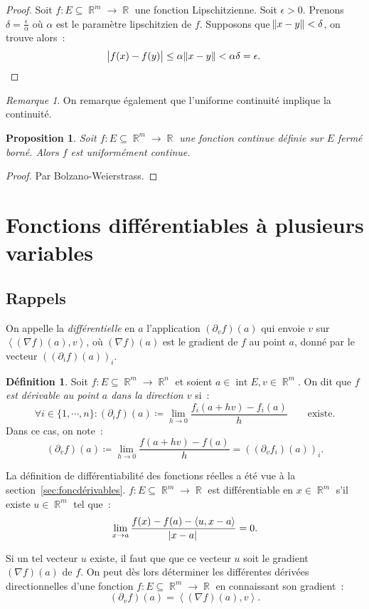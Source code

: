 \documentclass{article}
\DeclareMathOperator{\intr}{int}
\DeclareMathOperator{\R}{\mathbb R}
\newcommand{\scpr}[2]{{\left\langle#1, #2\right\rangle}}
\newcommand{\frmr}[2]{#1 : #2 \subseteq \R^m \to \R}
\newcommand{\frmrn}[2]{#1 : #2 \subseteq \R^m \to \R^n}
\newtheorem{prp}[thm]{Proposition}
\theoremstyle{definition}
\newtheorem{déf}[thm]{Définition}
\theoremstyle{remark}
\newtheorem*{rmq}{Remarque}
\begin{document}
		\begin{proof} Soit $\frmr fE$ une fonction Lipschitzienne. Soit $\epsilon > 0$. Prenons $\delta = \frac \epsilon\alpha$ où $\alpha$ est le paramètre
		lipschitzien de $f$. Supposons que $\norm{x-y} < \delta$, on trouve alors~:
		\[\abs {f(x)-f(y)} \leq \alpha\norm{x-y} < \alpha\delta = \epsilon.\]
		\end{proof}

		\begin{rmq} On remarque également que l'uniforme continuité implique la continuité. \end{rmq}

		\begin{prp} Soit $\frmr fE$ une fonction continue définie sur $E$ fermé borné. Alors $f$ est uniformément continue. \end{prp}

		\begin{proof} Par Bolzano-Weierstrass. \end{proof}

\newpage
\section{Fonctions différentiables à plusieurs variables}
	\subsection{Rappels}
		On appelle la \emph{différentielle} en $a$ l'application $(\partial_vf)(a)$ qui envoie $v$ sur $\scpr {(\nabla f)(a)}v$, où
		$(\nabla f)(a)$ est le gradient de $f$ au point $a$, donné par le vecteur $\left((\partial_if)(a)\right)_i$.

		\begin{déf} Soit $\frmrn fE$ et soient $a \in \intr E, v \in \R^m$. On dit que \emph{$f$ est dérivable au point $a$ dans la direction $v$} si~:
		\[\forall i \in \{1, \dotsb, n\} : (\partial_if)(a) \coloneqq \lim_{h \to 0}\frac {f_i(a+hv)-f_i(a)}h\qquad\text{existe}.\]
		Dans ce cas, on note~:
		\[(\partial_vf)(a) \coloneqq \lim_{h \to 0}\frac {f(a+hv)-f(a)}h = \left((\partial_vf_i)(a)\right)_i.\]
		\end{déf}

		La définition de différentiabilité des fonctions réelles a été vue à la section~\ref{sec:foncdérivables}. $\frmr fE$ est différentiable en $x \in \R^m$
		s'il existe $u \in \R^m$ tel que~:
		\[\lim_{x \to a}\frac {f(x)-f(a)-\scpr u{x-a}}{\abs {x-a}} = 0.\]

		Si un tel vecteur $u$ existe, il faut que que ce vecteur $u$ soit le gradient $(\nabla f)(a)$ de $f$. On peut dès lors déterminer les différentes
		dérivées directionnelles d'une fonction $\frmr fE$ en connaissant son gradient~:
		\[(\partial_vf)(a) = \scpr {(\nabla f)(a)}v.\]
\end{document}
